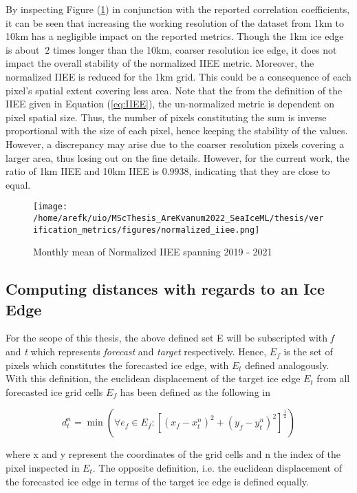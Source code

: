 \documentclass[../main/thesis.tex]{subfiles}
\begin{document}
By inspecting Figure (\ref{fig:normIIEE}) in conjunction with the reported correlation coefficients, it can be seen that increasing the working resolution of the dataset from 1km to 10km has a negligible impact on the reported metrics. Though the 1km ice edge is about $~2$ times longer than the 10km, coarser resolution ice edge, it does not impact the overall stability of the normalized IIEE metric. Moreover, the normalized IIEE is reduced for the 1km grid. This could be a consequence of each pixel's spatial extent covering less area. Note that the from the definition of the IIEE given in Equation (\ref{eq:IIEE}), the un-normalized metric is dependent on pixel spatial size. Thus, the number of pixels constituting the sum is inverse proportional with the size of each pixel, hence keeping the stability of the values. However, a discrepancy may arise due to the coarser resolution pixels covering a larger area, thus losing out on the fine details. However, for the current work, the ratio of 1km IIEE and 10km IIEE is $0.9938$, indicating that they are close to equal. 

\begin{figure}
    \texttt{[image: /home/arefk/uio/MScThesis\_AreKvanum2022\_SeaIceML/thesis/verification\_metrics/figures/normalized\_iiee.png]}

    \caption{\label{fig:normIIEE}Monthly mean of Normalized IIEE spanning 2019 - 2021}
\end{figure}

\subsection{Computing distances with regards to an Ice Edge}
For the scope of this thesis, the above defined set E will be subscripted with \textit{f} and \textit{t} which represents \textit{forecast} and \textit{target} respectively. Hence, $E_f$ is the set of pixels which constitutes the forecasted ice edge, with $E_t$ defined analogously. With this definition, the euclidean displacement of the target ice edge $E_t$ from all forecasted ice grid cells $E_f$ has been defined as the following in \cite{Melsom2019}

\begin{equation}
    \label{eq:ice_edge_displacement}
    d_t^n = \min{\left(\forall e_f\in E_f : \left[(x_f - x_t^n)^2 + (y_f - y_t^n)^2\right]^{\frac{1}{2}}\right)}
\end{equation}

where x and y represent the coordinates of the grid cells and n the index of the pixel inspected in $E_t$. The opposite definition, i.e. the euclidean displacement of the forecasted ice edge in terms of the target ice edge is defined equally.
\end{document}
